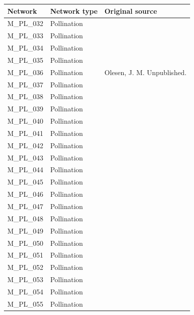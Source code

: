 \documentclass[12pt]{article}
\begin{document}
\begin{spacing}{1.0}
    \begin{table}[h!]
    \begin{center}
    \begin{tabular}{|l l m{6cm} |}
    \hline
    Network & Network type & Original source \\
    \hline
    M\_PL\_032  & Pollination & \citep{Schemske1978}  \\
    M\_PL\_033  & Pollination & \citep{Small1976} \\
    M\_PL\_034  & Pollination & \citep{SmithRamirez2005}  \\
    M\_PL\_035  & Pollination & \citep{Percival1974}  \\
    M\_PL\_036  & Pollination & Olesen, J. M. Unpublished.  \\
    M\_PL\_037  & Pollination & \citep{Montero2005} \\
    M\_PL\_038  & Pollination & \citep{Montero2005} \\
    M\_PL\_039  & Pollination & \citep{Stald2003} \\
    M\_PL\_040  & Pollination & \citep{Ingversen2006} \\
    M\_PL\_041  & Pollination & \citep{Ingversen2006} \\
    M\_PL\_042  & Pollination & \citep{Philipp2006} \\
    M\_PL\_043  & Pollination & \citep{Montero2005} \\
    M\_PL\_044  & Pollination & \citep{Kato2000}  \\
    M\_PL\_045  & Pollination & \citep{Lundgren2005}  \\
    M\_PL\_046  & Pollination & \citep{Bundgaard2003} \\
    M\_PL\_047  & Pollination & \citep{Dupont2009a}  \\
    M\_PL\_048  & Pollination & \citep{Dupont2009a}  \\
    M\_PL\_049  & Pollination & \citep{Bek2006}  \\
    M\_PL\_050  & Pollination & \citep{Stald2003} \\
    M\_PL\_051  & Pollination & \citep{Vazquez2002} \\
    M\_PL\_052  & Pollination & \citep{Witt1998}  \\
    M\_PL\_053  & Pollination & \citep{Yamazaki2003}  \\
    M\_PL\_054  & Pollination & \citep{Kakutani1990}  \\
    M\_PL\_055  & Pollination & \citep{Kato1996}  \\

\end{tabular}
\end{center}
\end{table}
\end{spacing}
\end{document}
